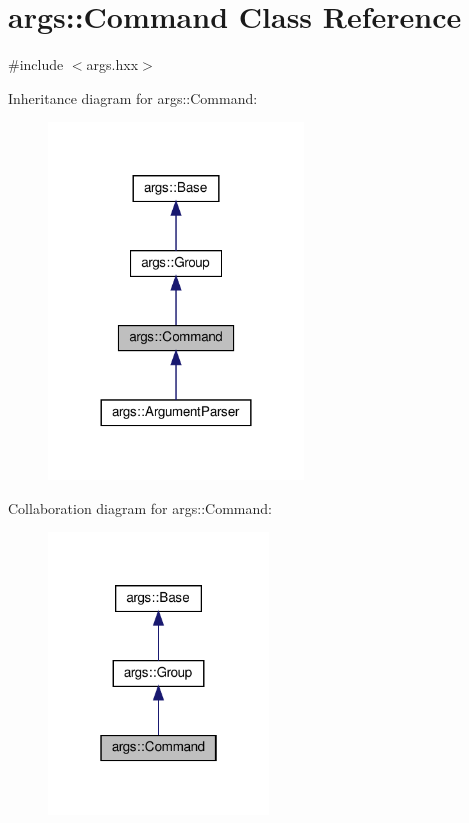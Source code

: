 \hypertarget{classargs_1_1_command}{}\section{args\+:\+:Command Class Reference}
\label{classargs_1_1_command}


{\ttfamily \#include $<$args.\+hxx$>$}



Inheritance diagram for args\+:\+:Command\+:\nopagebreak
\begin{figure}[H]
\begin{center}
\leavevmode
\includegraphics[width=192pt]{classargs_1_1_command__inherit__graph}
\end{center}
\end{figure}


Collaboration diagram for args\+:\+:Command\+:\nopagebreak
\begin{figure}[H]
\begin{center}
\leavevmode
\includegraphics[width=166pt]{classargs_1_1_command__coll__graph}
\end{center}
\end{figure}
